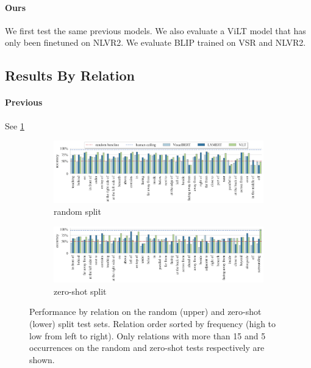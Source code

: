 \paragraph{Ours}

We first test the same previous models. We also evaluate a ViLT \cite{kim2021vilt} model that has only been finetuned on NLVR2. We evaluate BLIP \cite{li2022blip} trained on VSR and NLVR2.

\subsection{Results By Relation}

\paragraph{Previous}

See \cref{fig:performance_by_rel_base}

\begin{figure}
    \centering
\begin{subfigure}[b]{\linewidth}
    \centering
    \includegraphics[width=\linewidth]{images/visual-spatial-reasoning/performance_by_relation_random_split_v2.png}
    \vspace{-1cm}
    \caption{random split}
\end{subfigure}
\begin{subfigure}[b]{\linewidth}
    \centering
    \includegraphics[width=\linewidth]{images/visual-spatial-reasoning/performance_by_relation_zeroshot_split_v2.png}
    \vspace{-1cm}
    \caption{zero-shot split}
\end{subfigure}
\caption{Performance by relation on the random (upper) and zero-shot (lower) split test sets. Relation order sorted by frequency (high to low from left to right). Only relations with more than 15 and 5 occurrences on the random and zero-shot tests respectively are shown. }
    \label{fig:performance_by_rel_base}
\end{figure}

